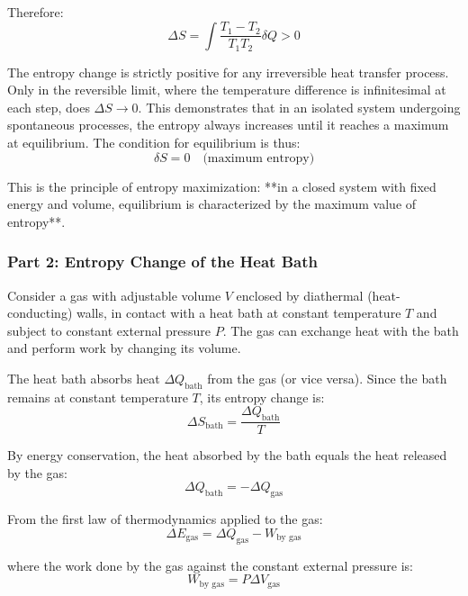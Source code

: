 \documentclass[10pt,twocoloumn]{article}
\begin{document}
Therefore:
\begin{equation}\boxed{\Delta S = \int \frac{T_1 - T_2}{T_1 T_2} \delta Q > 0}\end{equation}

The entropy change is strictly positive for any irreversible heat transfer process. Only in the reversible limit, where the temperature difference is infinitesimal at each step, does $\Delta S \to 0$. This demonstrates that in an isolated system undergoing spontaneous processes, the entropy always increases until it reaches a maximum at equilibrium. The condition for equilibrium is thus:
\begin{equation}\delta S = 0 \quad \text{(maximum entropy)}\end{equation}

This is the principle of entropy maximization: **in a closed system with fixed energy and volume, equilibrium is characterized by the maximum value of entropy**.

\subsubsection*{Part 2: Entropy Change of the Heat Bath}

Consider a gas with adjustable volume $V$ enclosed by diathermal (heat-conducting) walls, in contact with a heat bath at constant temperature $T$ and subject to constant external pressure $P$. The gas can exchange heat with the bath and perform work by changing its volume.

The heat bath absorbs heat $\Delta Q_{\text{bath}}$ from the gas (or vice versa). Since the bath remains at constant temperature $T$, its entropy change is:
\begin{equation}\Delta S_{\text{bath}} = \frac{\Delta Q_{\text{bath}}}{T}\end{equation}

By energy conservation, the heat absorbed by the bath equals the heat released by the gas:
\begin{equation}\Delta Q_{\text{bath}} = -\Delta Q_{\text{gas}}\end{equation}

From the first law of thermodynamics applied to the gas:
\begin{equation}\Delta E_{\text{gas}} = \Delta Q_{\text{gas}} - W_{\text{by gas}}\end{equation}

where the work done by the gas against the constant external pressure is:
\begin{equation}W_{\text{by gas}} = P \Delta V_{\text{gas}}\end{equation}
\end{document}
